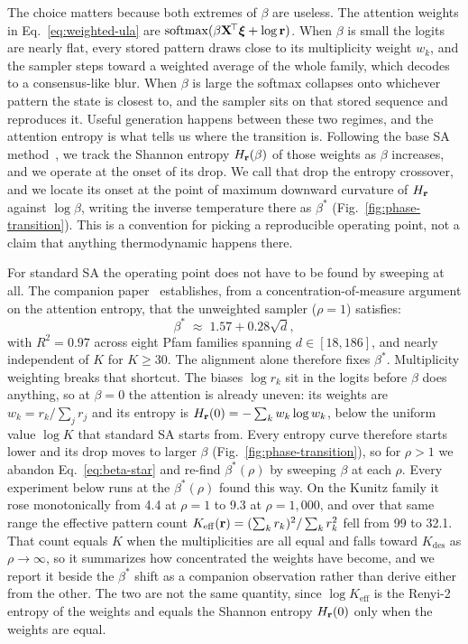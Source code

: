 The choice matters because both extremes of $\beta$ are useless. The attention weights
in Eq.~\eqref{eq:weighted-ula} are $\operatorname{softmax}(\beta\mathbf{X}^{\!\top}\bm{\xi} + \log\mathbf{r})$. When
$\beta$ is small the logits are nearly flat, every stored pattern draws close to its
multiplicity weight $w_k$, and the sampler steps toward a weighted average of the whole
family, which decodes to a consensus-like blur. When $\beta$ is large the softmax
collapses onto whichever pattern the state is closest to, and the sampler sits on that
stored sequence and reproduces it. Useful generation happens between these two
regimes, and the attention entropy is what tells us where the transition is.
Following the base SA method~\cite{varnerSAProtein2026}, we track the Shannon entropy
$H_{\mathbf{r}}(\beta)$ of those weights as $\beta$ increases, and we operate at the
onset of its drop. We call that drop the entropy crossover, and we locate its onset at
the point of maximum downward curvature of $H_{\mathbf{r}}$ against $\log\beta$, writing the
inverse temperature there as $\beta^{*}$ (Fig.~\ref{fig:phase-transition}). This is a
convention for picking a reproducible operating point, not a claim that anything
thermodynamic happens there.

For standard SA the operating point does not have to be found by sweeping at all. The
companion paper~\cite{varnerSAProtein2026} establishes, from a concentration-of-measure
argument on the attention entropy, that the unweighted sampler ($\rho=1$) satisfies:
\begin{equation}\label{eq:beta-star}
  \beta^{*} \;\approx\; 1.57 + 0.28\sqrt{d},
\end{equation}
with $R^{2}=0.97$ across eight Pfam families spanning $d \in [18, 186]$, and nearly
independent of $K$ for $K \geq 30$. The alignment alone therefore fixes $\beta^{*}$.
Multiplicity weighting breaks that shortcut. The biases $\log r_k$ sit in the logits before $\beta$ does
anything, so at $\beta=0$ the attention is already uneven: its weights are
$w_k = r_k/\sum_j r_j$ and its entropy is $H_{\mathbf{r}}(0) = -\sum_k w_k \log w_k$, below
the uniform value $\log K$ that standard SA starts from. Every entropy curve therefore
starts lower and its drop moves to larger $\beta$
(Fig.~\ref{fig:phase-transition}), so for $\rho > 1$ we abandon
Eq.~\eqref{eq:beta-star} and re-find $\beta^{*}(\rho)$ by sweeping $\beta$ at each
$\rho$. Every experiment below runs at the $\beta^{*}(\rho)$ found this way. On the
Kunitz family it rose monotonically from 4.4 at $\rho=1$ to 9.3 at $\rho=1{,}000$, and
over that same range the effective pattern count
$K_{\mathrm{eff}}(\mathbf{r}) = (\sum_k r_k)^{2}/\sum_k r_k^{2}$ fell from 99 to 32.1. That
count equals $K$ when the multiplicities are all equal and falls toward
$K_{\mathrm{des}}$ as $\rho\to\infty$, so it summarizes how concentrated the weights
have become, and we report it beside the $\beta^{*}$ shift as a companion observation
rather than derive either from the other. The two are not the same
quantity, since $\log K_{\mathrm{eff}}$ is the Renyi-2 entropy of the weights and
equals the Shannon entropy $H_{\mathbf{r}}(0)$ only when the weights are equal.

